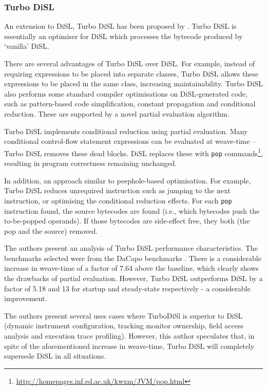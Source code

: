 		\subsubsection{Turbo DiSL} \label{sec:instrumentation/hybrid/disl/turbo}
		An extension to DiSL, Turbo DiSL has been proposed by \citet[p.~353-368]{Furia2012}. Turbo DiSL is essentially an optimiser for DiSL which processes the bytecode produced by `vanilla' DiSL.
		
		There are several advantages of Turbo DiSL over DiSL. For example, instead of requiring expressions to be placed into separate classes, Turbo DiSL allows these expressions to be placed in the same class, increasing maintainability. Turbo DiSL also performs some standard compiler optimisations on DiSL-generated code, such as pattern-based code simplification, constant propagation and conditional reduction. These are supported by a novel partial evaluation algorithm.
		
		Turbo DiSL implements conditional reduction using partial evaluation. Many conditional control-flow statement expressions can be evaluated at weave-time -- Turbo DiSL removes these dead blocks. DiSL replaces these with \texttt{pop} commands\footnote{\url{http://homepages.inf.ed.ac.uk/kwxm/JVM/pop.html}}, resulting in program correctness remaining unchanged.
		
		In addition, an approach similar to peephole-based optimisation. For example, Turbo DiSL reduces unrequired instruction such as jumping to the next instruction, or optimising the conditional reduction effects. For each \texttt{pop} instruction found, the source bytecodes are found (i.e., which bytecodes push the to-be-popped operands). If those bytecodes are side-effect free, they both (the pop and the source) removed.
		
		The authors present an analysis of Turbo DiSL performance characteristics. The benchmarks selected were from the DaCapo benchmarks \citep{Blackburn2006}. There is a considerable increase in weave-time of a factor of 7.64 above the baseline, which clearly shows the drawbacks of partial evaluation. However, Turbo DiSL outperforms DiSL by a factor of 5.18 and 13 for startup and steady-state respectively - a considerable improvement.

		The authors present several uses cases where TurboDiSl is superior to DiSL (dynamic instrument configuration, tracking monitor ownership, field access analysis and execution trace profiling). However, this author speculates that, in spite of the aforementioned increase in weave-time, Turbo DiSL will completely supersede DiSL in all situations. 
